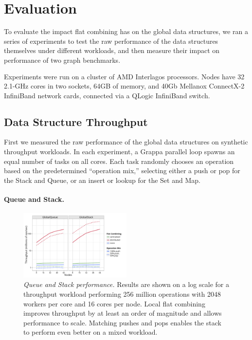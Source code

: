 \section{Evaluation}
To evaluate the impact flat combining has on the global data structures, we ran a series of experiments to test the raw performance of the data structures themselves under different workloads, and then measure their impact on performance of two graph benchmarks.

Experiments were run on a cluster of AMD Interlagos processors. Nodes have 32 2.1-GHz cores in two sockets, 64GB of memory, and 40Gb Mellanox ConnectX-2 InfiniBand network cards, connected via a QLogic InfiniBand switch.

\subsection{Data Structure Throughput}
First we measured the raw performance of the global data structures on synthetic throughput workloads. In each experiment, a Grappa parallel loop spawns an equal number of tasks on all cores. Each task randomly chooses an operation based on the predetermined ``operation mix,'' selecting either a push or pop for the Stack and Queue, or an insert or lookup for the Set and Map.

\paragraph{Queue and Stack.}
\begin{figure}[t]
  \centering
  \includegraphics[width=0.5\textwidth]{data/plots/vector_perf.pdf}
  \caption{\emph{Queue and Stack performance.}
    Results are shown on a log scale for a throughput workload performing 256 million operations with 2048 workers per core and 16 cores per node. Local flat combining improves throughput by at least an order of magnitude and allows performance to scale. Matching pushes and pops enables the stack to perform even better on a mixed workload.
  }
  \label{fig:vector}
\end{figure}

